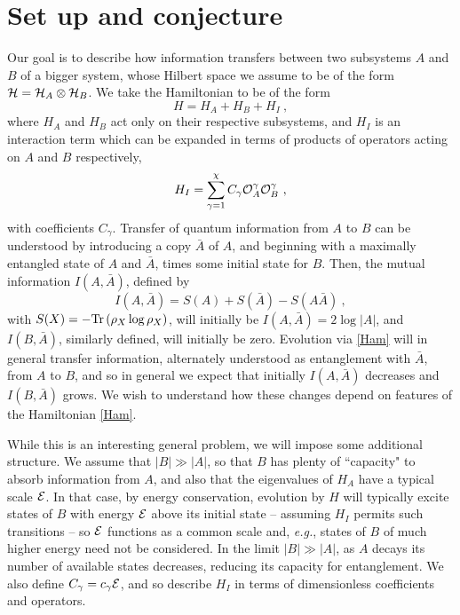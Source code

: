 \documentclass[aps,prd,groupedaddress,nofootinbib,letterpaper]{revtex4}
\newcommand{\calo}{{\cal O}}
\newcommand{\calh}{{\cal H}}
\newcommand{\cale}{{\cal E}}
\newcommand{\beq}{\begin{equation}}
\newcommand{\eeq}{\end{equation}}
\newcommand{\abar}{{\bar A}}
\begin{document}
\section{Set up and conjecture}

Our goal is to describe how information transfers between two subsystems $A$ and $B$ of a bigger system, whose Hilbert space we assume to be of the form $\calh=\calh_A\otimes\calh_B$.  We take the Hamiltonian to be of the form
\beq\label{Ham}
H=H_A+H_B+H_I\ ,
\eeq
where $H_A$ and $H_B$ act only on their respective subsystems, and $H_I$ is an interaction term which can be expanded in terms of products of operators acting on $A$ and $B$ respectively,
\beq\label{Hint}
H_I= \sum_{\gamma=1}^\chi C_\gamma \calo^\gamma_A \calo^\gamma_B\ ,
\eeq
with coefficients $C_\gamma$.  Transfer of quantum information from $A$ to $B$ can be understood by introducing a copy $\abar$ of $A$, and beginning with a maximally entangled state of $A$ and $\abar$, times some initial state for $B$.  Then, the mutual information $I(A,\abar)$, defined by 
\beq\label{MIdef}
I(A,\abar)=S(A)+S(\abar)-S(A\abar)\ ,
\eeq
with $S(X) = - {\rm Tr}\left( \rho_X \log \rho_X\right)$, 
will initially be $I(A,\abar)=2\log |A|$, and $I(B,\abar)$, similarly defined, will initially be zero.  Evolution via \eqref{Ham} will in general transfer information, alternately understood as  entanglement with $\abar$, from $A$ to $B$, and so in general we expect that initially 
$I(A,\abar)$ decreases and $I(B,\abar)$ grows.  We wish to understand how these changes depend on features of the Hamiltonian \eqref{Ham}.

While this is an interesting general problem, we will impose some additional structure.  We assume that $|B|\gg|A|$, so that $B$ has plenty of ``capacity" to absorb information from $A$, and also that the eigenvalues of $H_A$ have a typical scale $\cale$.  In that case, by energy conservation, evolution by $H$ will typically excite states of $B$ with energy $\cale$ above its initial state -- assuming $H_I$ permits such transitions -- so $\cale$ functions as a common scale and, {\it e.g.}, states of $B$ of much higher energy need not be considered.  In the limit $|B|\gg|A|$, as $A$ decays its number of available states decreases, reducing its capacity for entanglement.
We also define $C_\gamma=c_\gamma \cale$, and so describe $H_I$ in terms of dimensionless coefficients and operators.
\end{document}
